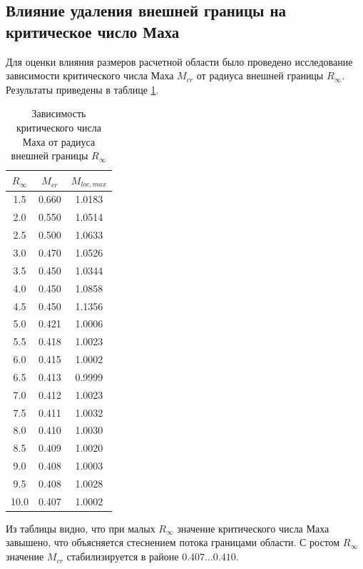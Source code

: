 \documentclass[a4paper,12pt]{article}
\begin{document}
	\subsection{Влияние удаления внешней границы на критическое число Маха}

	Для оценки влияния размеров расчетной области было проведено исследование зависимости критического числа Маха $M_{cr}$ от радиуса внешней границы $R_\infty$. Результаты приведены в таблице \ref{tab:r_study}.

	\begin{table}[H]
		\centering
		\caption{Зависимость критического числа Маха от радиуса внешней границы $R_\infty$}
		\label{tab:r_study}
		\begin{tabular}{ccc}
			\toprule
			$R_\infty$ & $M_{cr}$ & $M_{loc, max}$ \\
			\midrule
			1.5 & 0.660 & 1.0183 \\
			2.0 & 0.550 & 1.0514 \\
			2.5 & 0.500 & 1.0633 \\
			3.0 & 0.470 & 1.0526 \\
			3.5 & 0.450 & 1.0344 \\
			4.0 & 0.450 & 1.0858 \\
			4.5 & 0.450 & 1.1356 \\
			5.0 & 0.421 & 1.0006 \\
			5.5 & 0.418 & 1.0023 \\
			6.0 & 0.415 & 1.0002 \\
			6.5 & 0.413 & 0.9999 \\
			7.0 & 0.412 & 1.0023 \\
			7.5 & 0.411 & 1.0032 \\
			8.0 & 0.410 & 1.0030 \\
			8.5 & 0.409 & 1.0020 \\
			9.0 & 0.408 & 1.0003 \\
			9.5 & 0.408 & 1.0028 \\
			10.0 & 0.407 & 1.0002 \\
			\bottomrule
		\end{tabular}
	\end{table}

	Из таблицы видно, что при малых $R_\infty$ значение критического числа Маха завышено, что объясняется стеснением потока границами области. С ростом $R_\infty$ значение $M_{cr}$ стабилизируется в районе $0.407 \dots 0.410$.

	\appendix
\end{document}

